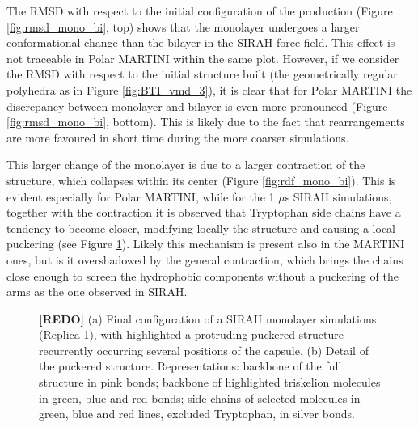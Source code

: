 The RMSD with respect to the initial configuration of the production (Figure \ref{fig:rmsd_mono_bi}, top) shows that the monolayer undergoes a larger conformational change than the bilayer in the SIRAH force field. This effect is not traceable in Polar MARTINI within the same plot. However, if we consider the RMSD with respect to the initial structure built (the geometrically regular polyhedra as in Figure \ref{fig:BTI_vmd_3}), it is clear that for Polar MARTINI the discrepancy between monolayer and bilayer is even more pronounced (Figure \ref{fig:rmsd_mono_bi}, bottom). This is likely due to the fact that rearrangements are more favoured in short time during the more coarser simulations.

This larger change of the monolayer is due to a larger contraction of the structure, which collapses within its center (Figure \ref{fig:rdf_mono_bi}).
%
This is evident especially for Polar MARTINI, while for the 1 $\mu$s SIRAH simulations, together with the contraction it is observed that Tryptophan side chains have a tendency to become closer, modifying locally the structure and causing a local puckering (see Figure \ref{fig:sirah_mono_pic}). Likely this mechanism is present also in the MARTINI ones, but is it overshadowed by the general contraction, which brings the chains close enough to screen the hydrophobic components without a puckering of the arms as the one observed in SIRAH.
%
\begin{figure}[p!]
\centering
{}
\caption[Snapshot of SIRAH monolayer simulation]{\textbf{[REDO]} (a) Final configuration of a SIRAH monolayer simulations (Replica 1), with highlighted a protruding puckered structure recurrently occurring several positions of the capsule. (b) Detail of the puckered structure. Representations: backbone of the full structure in pink bonds; backbone of highlighted triskelion molecules in green, blue and red bonds; side chains of selected molecules in green, blue and red lines, excluded Tryptophan, in silver bonds.}
\label{fig:sirah_mono_pic}
\end{figure}

